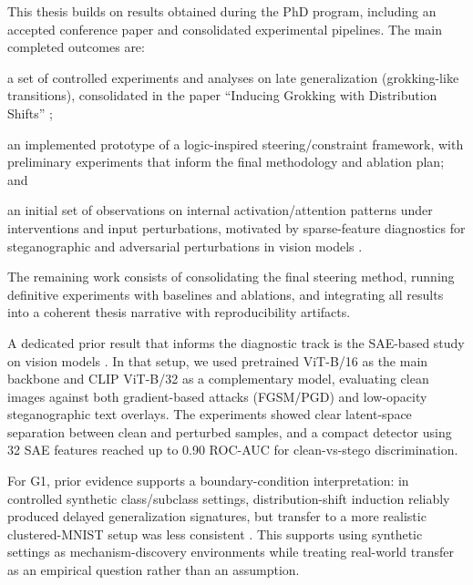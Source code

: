 ﻿\documentclass[../../ppgc-prop-tese.tex]{subfiles}
\begin{document}

This thesis builds on results obtained during the PhD program, including an accepted conference paper and consolidated experimental pipelines. The main completed outcomes are:
%
\begin{enumerate*}[label=(\roman*)]
  \item a set of controlled experiments and analyses on late generalization (grokking-like transitions), consolidated in the paper ``Inducing Grokking with Distribution Shifts'' \cite{carvalho2025inducing_grokking_distribution_shifts};
  \item an implemented prototype of a logic-inspired steering/constraint framework, with preliminary experiments that inform the final methodology and ablation plan; and
  \item an initial set of observations on internal activation/attention patterns under interventions and input perturbations, motivated by sparse-feature diagnostics for steganographic and adversarial perturbations in vision models \cite{carvalho2026interpretable_stego_detection_sae}.
\end{enumerate*}
%
The remaining work consists of consolidating the final steering method, running definitive experiments with baselines and ablations, and integrating all results into a coherent thesis narrative with reproducibility artifacts.

A dedicated prior result that informs the diagnostic track is the SAE-based study on vision models \cite{carvalho2026interpretable_stego_detection_sae}. In that setup, we used pretrained ViT-B/16 as the main backbone and CLIP ViT-B/32 as a complementary model, evaluating clean images against both gradient-based attacks (FGSM/PGD) and low-opacity steganographic text overlays. The experiments showed clear latent-space separation between clean and perturbed samples, and a compact detector using 32 SAE features reached up to 0.90 ROC-AUC for clean-vs-stego discrimination.

For G1, prior evidence supports a boundary-condition interpretation: in controlled synthetic class/subclass settings, distribution-shift induction reliably produced delayed generalization signatures, but transfer to a more realistic clustered-MNIST setup was less consistent \cite{carvalho2025inducing_grokking_distribution_shifts}. This supports using synthetic settings as mechanism-discovery environments while treating real-world transfer as an empirical question rather than an assumption.
\end{document}
